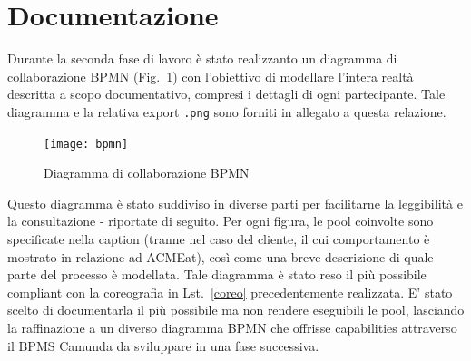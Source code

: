 \documentclass[11pt]{article} %
\begin{document}
\clearpage

\section{Documentazione}
\label{sez:documentazione}

Durante la seconda fase di lavoro è stato realizzanto un diagramma di collaborazione BPMN (Fig.~\ref{bpmn}) con l'obiettivo di modellare l'intera realtà descritta a scopo documentativo, compresi i dettagli di ogni partecipante. Tale diagramma e la relativa export \verb|.png| sono forniti in allegato a questa relazione.

\begin{figure}[!ht]
\texttt{[image: bpmn]}
\caption{Diagramma di collaborazione BPMN}
\label{bpmn}
\end{figure}

Questo diagramma è stato suddiviso in diverse parti per facilitarne la leggibilità e la consultazione - riportate di seguito. Per ogni figura, le pool coinvolte sono specificate nella caption (tranne nel caso del cliente, il cui comportamento è mostrato in relazione ad ACMEat), così come una breve descrizione di quale parte del processo è modellata. Tale diagramma è stato reso il più possibile compliant con la coreografia in Lst.~\ref{coreo} precedentemente realizzata. E' stato scelto di documentarla il più possibile ma non rendere eseguibili le pool, lasciando la raffinazione a un diverso diagramma BPMN che offrisse capabilities attraverso il BPMS Camunda da sviluppare in una fase successiva.
\end{document}
